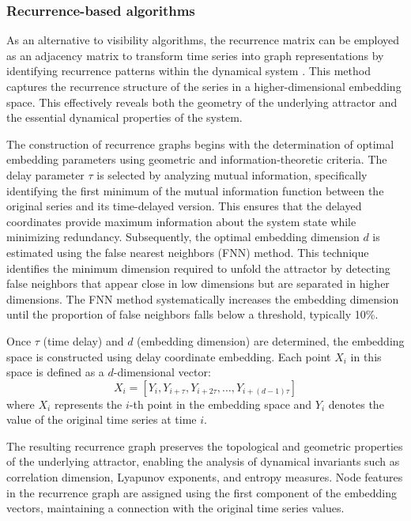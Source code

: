 \documentclass[11pt,a4paper]{article}
\begin{document}
\subsubsection{Recurrence-based algorithms}

As an alternative to visibility algorithms, the recurrence matrix can be employed as an adjacency matrix to transform time series into graph representations by identifying recurrence patterns within the dynamical system \citep{eckmann1987recurrence}. This method captures the recurrence structure of the series in a higher-dimensional embedding space. This effectively reveals both the geometry of the underlying attractor and the essential dynamical properties of the system.

The construction of recurrence graphs begins with the determination of optimal embedding parameters using geometric and information-theoretic criteria. The delay parameter $\tau$ is selected by analyzing mutual information, specifically identifying the first minimum of the mutual information function between the original series and its time-delayed version. This ensures that the delayed coordinates provide maximum information about the system state while minimizing redundancy. Subsequently, the optimal embedding dimension $d$ is estimated using the false nearest neighbors (FNN) method. This technique identifies the minimum dimension required to unfold the attractor by detecting false neighbors that appear close in low dimensions but are separated in higher dimensions. The FNN method systematically increases the embedding dimension until the proportion of false neighbors falls below a threshold, typically 10\%.

Once $\tau$ (time delay) and $d$ (embedding dimension) are determined, the embedding space is constructed using delay coordinate embedding. Each point $X_i$ in this space is defined as a $d$-dimensional vector:
\begin{equation}
X_i = [Y_i, Y_{i+\tau}, Y_{i+2\tau}, \ldots, Y_{i+(d-1)\tau}]
\end{equation}
where $X_i$ represents the $i$-th point in the embedding space and $Y_i$ denotes the value of the original time series at time $i$.

The resulting recurrence graph preserves the topological and geometric properties of the underlying attractor, enabling the analysis of dynamical invariants such as correlation dimension, Lyapunov exponents, and entropy measures. Node features in the recurrence graph are assigned using the first component of the embedding vectors, maintaining a connection with the original time series values.
\end{document}
